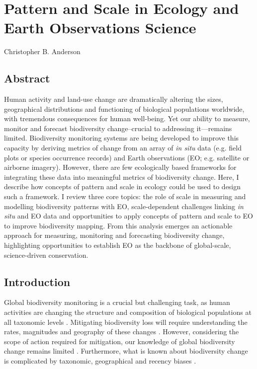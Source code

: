 \chapter[Pattern and Scale in Ecology and Earth Observations]{Pattern and Scale in Ecology and Earth Observations Science}

Christopher B. Anderson

\section{Abstract}

Human activity and land-use change are dramatically altering the sizes, geographical distributions and functioning of biological populations worldwide, with tremendous consequences for human well-being. Yet our ability to measure, monitor and forecast biodiversity change–crucial to addressing it—remains limited. Biodiversity monitoring systems are being developed to improve this capacity by deriving metrics of change from an array of \textit{in situ} data (e.g. field plots or species occurrence records) and Earth observations (EO; e.g. satellite or airborne imagery). However, there are few ecologically based frameworks for integrating these data into meaningful metrics of biodiversity change. Here, I describe how concepts of pattern and scale in ecology could be used to design such a framework. I review three core topics: the role of scale in measuring and modelling biodiversity patterns with EO, scale-dependent challenges linking \textit{in situ} and EO data and opportunities to apply concepts of pattern and scale to EO to improve biodiversity mapping. From this analysis emerges an actionable approach for measuring, monitoring and forecasting biodiversity change, highlighting opportunities to establish EO as the backbone of global-scale, science-driven conservation.

\section{Introduction}

Global biodiversity monitoring is a crucial but challenging task, as human activities are changing the structure and composition of biological populations at all taxonomic levels \cite{Dirzo2014-wd,Ceballos2017-un}. Mitigating biodiversity loss will require understanding the rates, magnitudes and geography of these changes \cite{Laurance2012-ic, Mendenhall2014-fh}. However, considering the scope of action required for mitigation, our knowledge of global biodiversity change remains limited \cite{Daily1999-mv,Pereira2012-vm}. Furthermore, what is known about biodiversity change is complicated by taxonomic, geographical and recency biases \cite{Boakes2010-xq,Donaldson2016-er,Gonzalez2016-gh}.

